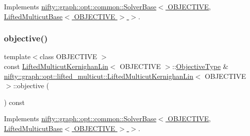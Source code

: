 Implements \hyperlink{classnifty_1_1graph_1_1opt_1_1common_1_1SolverBase_af638b9a804cfec3e35fe87c77e942d30}{nifty\+::graph\+::opt\+::common\+::\+Solver\+Base$<$ O\+B\+J\+E\+C\+T\+I\+V\+E, Lifted\+Multicut\+Base$<$ O\+B\+J\+E\+C\+T\+I\+V\+E $>$ $>$}.

\mbox{\label{classnifty_1_1graph_1_1opt_1_1lifted__multicut_1_1LiftedMulticutKernighanLin_a14feeebb40c32f817af780c6605b8a7d}} 
\subsubsection{\texorpdfstring{objective()}{objective()}}
{\footnotesize\ttfamily template$<$class O\+B\+J\+E\+C\+T\+I\+VE $>$ \\
const \hyperlink{classnifty_1_1graph_1_1opt_1_1lifted__multicut_1_1LiftedMulticutKernighanLin}{Lifted\+Multicut\+Kernighan\+Lin}$<$ O\+B\+J\+E\+C\+T\+I\+VE $>$\+::\hyperlink{classnifty_1_1graph_1_1opt_1_1lifted__multicut_1_1LiftedMulticutKernighanLin_ace1226557a9d65b35b09e1e38b11b0b3}{Objective\+Type} \& \hyperlink{classnifty_1_1graph_1_1opt_1_1lifted__multicut_1_1LiftedMulticutKernighanLin}{nifty\+::graph\+::opt\+::lifted\+\_\+multicut\+::\+Lifted\+Multicut\+Kernighan\+Lin}$<$ O\+B\+J\+E\+C\+T\+I\+VE $>$\+::objective (\begin{DoxyParamCaption}{ }\end{DoxyParamCaption}) const\hspace{0.3cm}{\ttfamily [virtual]}}



Implements \hyperlink{classnifty_1_1graph_1_1opt_1_1common_1_1SolverBase_a55e9eb645c07d6e0782ebfb990ab3c84}{nifty\+::graph\+::opt\+::common\+::\+Solver\+Base$<$ O\+B\+J\+E\+C\+T\+I\+V\+E, Lifted\+Multicut\+Base$<$ O\+B\+J\+E\+C\+T\+I\+V\+E $>$ $>$}.

\mbox{\label{classnifty_1_1graph_1_1opt_1_1lifted__multicut_1_1LiftedMulticutKernighanLin_a1a171e9e18477dd7b3446fd5d09dda39}} 

